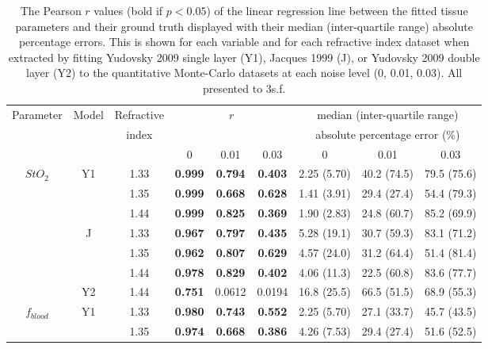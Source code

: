 \begin{table}[htb!]
    \centering
    \caption{The Pearson $r$ values (bold if $p<0.05$) of the linear regression line between the fitted tissue parameters and their ground truth displayed with their median (inter-quartile range) absolute percentage errors. This is shown for each variable and for each refractive index dataset when extracted by fitting Yudovsky 2009 single layer (Y1), Jacques 1999 (J), or Yudovsky 2009 double layer (Y2) to the quantitative Monte-Carlo datasets at each noise level (0, 0.01, 0.03). All presented to 3s.f.}
    \begin{tabular}{|ccc|ccc|ccc|}
        \hline
        Parameter & Model & Refractive & \multicolumn{3}{c}{$r$} & \multicolumn{3}{|c|}{median (inter-quartile range)} \\
        & & index & \multicolumn{3}{c}{} & \multicolumn{3}{|c|}{absolute percentage error (\%)} \\
        & & & 0 & 0.01 & 0.03 & 0 & 0.01 & 0.03 \\
        \hline
        \multirow{7}{*}{$StO_2$} & \multirow{3}{*}{Y1} & 1.33 & \textbf{0.999} & \textbf{0.794} & \textbf{0.403} & 2.25 (5.70) & 40.2 (74.5) & 79.5 (75.6) \\
        & & 1.35 & \textbf{0.999} & \textbf{0.668} & \textbf{0.628} & 1.41 (3.91) & 29.4 (27.4) & 54.4 (79.3) \\
        & & 1.44 & \textbf{0.999} & \textbf{0.825} & \textbf{0.369} & 1.90 (2.83) & 24.8 (60.7) & 85.2 (69.9) \\
        \cline{2-9}
        & \multirow{3}{*}{J} & 1.33 & \textbf{0.967} & \textbf{0.797} & \textbf{0.435} & 5.28 (19.1) & 30.7 (59.3) & 83.1 (71.2) \\
        & & 1.35 & \textbf{0.962} & \textbf{0.807} & \textbf{0.629} & 4.57 (24.0) & 31.2 (64.4) & 51.4 (81.4) \\
        & & 1.44 &  \textbf{0.978} & \textbf{0.829} & \textbf{0.402} & 4.06 (11.3) & 22.5 (60.8) & 83.6 (77.7) \\
        \cline{2-9}
        & Y2 & 1.44 & \textbf{0.751} & 0.0612 & 0.0194 & 16.8 (25.5) & 66.5 (51.5) & 68.9 (55.3) \\
        \hline
        \multirow{7}{*}{$f_{blood}$} & \multirow{3}{*}{Y1} & 1.33 & \textbf{0.980} & \textbf{0.743} & \textbf{0.552} & 2.25 (5.70) & 27.1 (33.7) & 45.7 (43.5) \\
        & & 1.35 & \textbf{0.974} & \textbf{0.668} & \textbf{0.386} & 4.26 (7.53) & 29.4 (27.4) & 51.6 (52.5) \\

\end{tabular}
\end{table}

